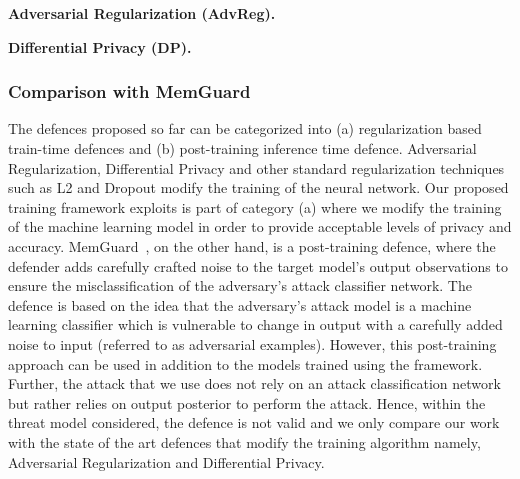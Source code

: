 \noindent\textbf{Adversarial Regularization (AdvReg).}~\cite{DBLP:conf/ccs/NasrSH18}


\noindent\textbf{Differential Privacy (DP).}~\cite{Abadi:2016:DLD:2976749.2978318}





\subsubsection{Comparison with MemGuard}

The defences proposed so far can be categorized into (a) regularization based train-time defences and (b) post-training inference time defence.
Adversarial Regularization, Differential Privacy and other standard regularization techniques such as L2 and Dropout modify the training of the neural network.
Our proposed training framework exploits is part of category (a) where we modify the training of the machine learning model in order to provide acceptable levels of privacy and accuracy.
MemGuard~\cite{10.1145/3319535.3363201}, on the other hand, is a post-training defence, where the defender adds carefully crafted noise to the target model's output observations to ensure the misclassification of the adversary's attack classifier network.
The defence is based on the idea that the adversary's attack model is a machine learning classifier which is vulnerable to change in output with a carefully added noise to input (referred to as adversarial examples).
However, this post-training approach can be used in addition to the models trained using the \method\hspace{0.02in} framework.
Further, the attack that we use does not rely on an attack classification network but rather relies on output posterior to perform the attack.
Hence, within the threat model considered, the defence is not valid and we only compare our work with the state of the art defences that modify the training algorithm namely, Adversarial Regularization and Differential Privacy.
